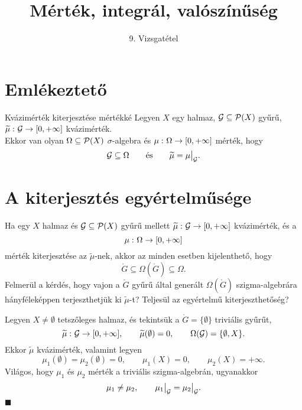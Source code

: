 \documentclass[
]{elteikthesis}[2024/04/26]
\title{Mérték, integrál, valószínűség} %
\subtitle{9. Vizsgatétel}
\begin{document}
	
	
	\section{Emlékeztető}
		
	\begin{theorem}{Kvázimérték kiterjesztése mértékké}{}
		Legyen \( X \) egy halmaz, 
		\( \mathcal{G} \subseteq \mathcal{P}( X ) \) gyűrű, 
		\( \widetilde{\mu}  \,\colon  \mathcal{G}  \to  [0, +\infty] \) kvázimérték.\\[3pt]
		Ekkor van olyan \( \Omega \subseteq \mathcal{P}( X ) \) \( \sigma \)-algebra és 
		\( \mu  \,\colon  \Omega  \to  [0, +\infty] \) mérték, hogy 
		\[
			\ring{G} \subseteq \Omega
			\qquad \text{és} \qquad
			\widetilde{\mu} = \restr{\mu}{\ring{G}}.
		\]
	\end{theorem}
	
	\section{A kiterjesztés egyértelműsége}
	
	Ha egy \( X \) halmaz és \( \mathcal{G} \subseteq \mathcal{P}( X ) \) gyűrű mellett
	\( \widetilde{\mu} \,\colon \mathcal{G} \to [0, +\infty] \) kvázimérték, és a
	\[
		\mu \,\colon \Omega \to [0, +\infty]
	\]
	mérték kiterjesztése az \( \widetilde{\mu} \)-nek, akkor az minden esetben kijelenthető, hogy
	\[
		\ring{G} \subseteq \Omega( \ring{G} ) \subseteq \Omega.
	\]
	Felmerül a kérdés, hogy vajon a \( \ring{G} \) gyűrű által generált \( \Omega( \ring{G} ) \) szigma-algebrára hányféleképpen terjeszthetjük ki \( \widetilde{\mu} \)-t?
	Teljesül az egyértelmű kiterjeszthetőség?
	
	\begin{example}
		Legyen \( X \neq \emptyset \) tetszőleges halmaz,
		és tekintsük a \( \ring{G} = \{ \emptyset \} \) triviális gyűrűt,
		\[
			\widetilde{\mu} \,\colon \mathcal{G} \to [0, +\infty], \qquad
			\widetilde{\mu}(\emptyset) = 0, \qquad
			\Omega( \mathcal{G} ) = \{ \emptyset, X \}.
		\]
		Ekkor \( \widetilde{ \mu } \) kvázimérték, valamint legyen
		\[
			\mu_1( \emptyset ) = \mu_2( \emptyset ) = 0, \qquad
			\mu_1( X ) = 0, \qquad
			\mu_2( X ) = +\infty.
		\]
		Világos, hogy \( \mu_1 \) és \( \mu_2 \) mérték a triviális szigma-algebrán, ugyanakkor
		\[
			\mu_1 \neq \mu_2, \qquad 
			\restr{ \mu_1 }{ \ring{G} } = \restr{ \mu_2 }{ \ring{G} }.
		\]
		\null\hfill \( \blacksquare \)
	\end{example}
	
\end{document}
